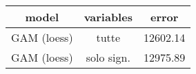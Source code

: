\begin{table}[tb]
\centering
\begin{tabular}{| c | c | c }
  \hline
model & variables & error \\ 
  \hline
GAM (loess) & tutte & 12602.14 \\ 
  GAM (loess) & solo sign. & 12975.89 \\ 
   \hline
\end{tabular}
\caption{} 
\label{}
\end{table}
